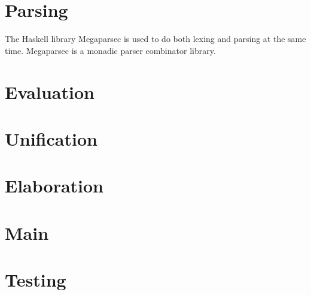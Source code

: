 \section{Parsing}

The Haskell library Megaparsec is used to do both lexing and parsing at the same
time. Megaparsec is a monadic parser combinator library.

\section{Evaluation}

\section{Unification}

\section{Elaboration}

\section{Main}

\section{Testing}
